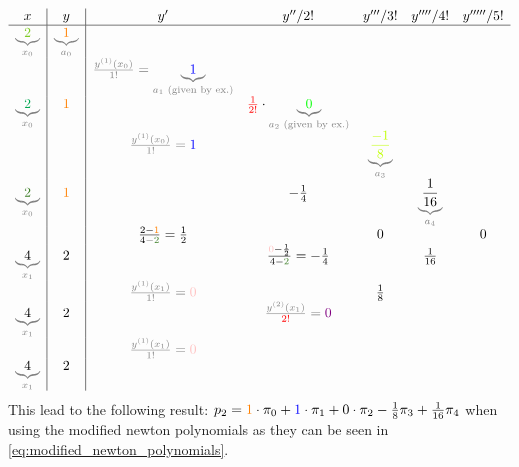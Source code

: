 \[
	\begin{array}{c|c|ccccc}
 x & y & y' & y''/2! &y'''/3! &y''''/4! &y'''''/5!\\
\hline
	\textcolor{gray}{\underbrace{\textcolor{LimeGreen}{2}}_{x_0}} & \textcolor{gray}{\underbrace{\textcolor{orange}{1}}_{a_0}}\\
	    &     & \textcolor{gray}{\frac{y^{(1)}\left(x_0\right)}{1 !}=\underbrace{\textcolor{blue}{1}}_{a_1\text{ (given by ex.)}}} \\
	\textcolor{gray}{\underbrace{\textcolor{Green}{2}}_{x_0}} & \textcolor{orange}{1}&             & \textcolor{red}{\frac{1}{2!}}\cdot\textcolor{gray}{\underbrace{\textcolor{green}{0}}_{a_2\text{ (given by ex.)}}}\\
	    &     &  \textcolor{gray}{\frac{y^{(1)}\left(x_0\right)}{1 !}=\textcolor{blue}{1}}  &              & \textcolor{gray}{\underbrace{\textcolor{lime}{\frac{-1}{8}}}_{a_3}}\\
	\textcolor{gray}{\underbrace{\textcolor{OliveGreen}{2}}_{x_0}} & \textcolor{orange}{1} &             & -\frac{1}{4} & & \textcolor{gray}{\underbrace{\textcolor{black}{\frac{1}{16}}}_{a_4}}\\           
	    &     & \frac{2-\textcolor{orange}{1}}{4-\textcolor{OliveGreen}{2}}=\frac{1}{2} & & 0   &    & 0\\         
	\textcolor{gray}{\underbrace{\textcolor{black}{4}}_{x_1}} & 2    & &\frac{\textcolor{pink}{0}-\frac{1}{2}}{4-\textcolor{OliveGreen}{2}}=-\frac{1}{4} & &\frac{1}{16}\\
	    &     & \textcolor{gray}{\frac{y^{(1)}\left(x_1\right)}{1 !}=\textcolor{pink}{0}} & &\frac{1}{8}\\ 
        \textcolor{gray}{\underbrace{\textcolor{black}{4}}_{x_1}} & 2    &&  \textcolor{gray}{\frac{y^{(2)}\left(x_1\right)}{\textcolor{red}{2!}}=\textcolor{violet}{0}}\\
	    &     & \textcolor{gray}{\frac{y^{(1)}\left(x_1\right)}{1 !}=\textcolor{pink}{0}}\\ 
        \textcolor{gray}{\underbrace{\textcolor{black}{4}}_{x_1}} & 2    

	\end{array}
\]
This lead to the following result: $p_2=\textcolor{orange}{1}\cdot\pi_0 + \textcolor{blue}{1}\cdot \pi_1 + 0\cdot\pi_2-\frac{1}{8}\pi_3+\frac{1}{16}\pi_4$ when using the modified newton polynomials as they can be seen in \autoref{eq:modified_newton_polynomials}.
